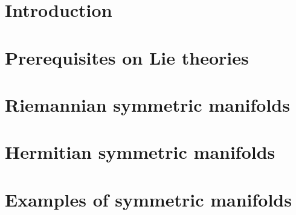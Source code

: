 \documentclass[twoside,12pt]{article}
\begin{document}
\setcounter{page}{1}
\renewcommand{\thepage}{\arabic{page}}

\section{Introduction}


\clearpage


\section{Prerequisites on Lie theories}


\clearpage

\section{Riemannian symmetric manifolds}


\clearpage

\section{Hermitian symmetric manifolds}



\section{Examples of symmetric manifolds}





\clearpage


\printbibliography
\newpage
\end{document}

